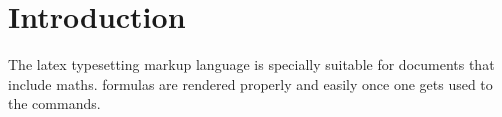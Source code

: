 
\section{Introduction}

The \Gls{latex} typesetting markup language is specially suitable 
for documents that include \gls{maths}. \Glspl{formula} are rendered 
properly and easily once one gets used to the commands.\cite{billen_kundenbindung_2005}
